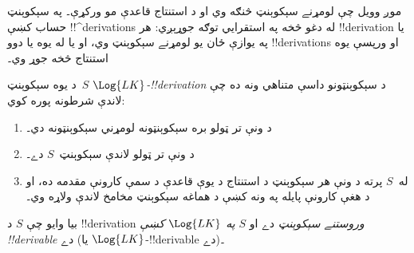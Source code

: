 \documentclass[../../../include/open-logic-section]{subfiles}
\begin{document}
      {}
      {}


\begin{explain}
موږ وويل چې لومړنے سېکوېنټ څنګه وي او د استنتاج قاعدې مو ورکړې۔
په سېکوېنټ حساب کښې !!^{derivation}s له دغو څخه په استقرايي توګه
جوړېږي: هر !!{derivation} يا په يوازې ځان يو لومړنے سېکوېنټ وي،
او يا له يوه يا دوو !!{derivation}s او ورپسې يوه استنتاج څخه جوړ وي۔
\end{explain}

\begin{defn}
د يوه سېکوېنټ~$S$ \emph{$\Log{LK}$-!!{derivation}} د سېکوېنټونو
داسې متناهي ونه ده چې لاندې شرطونه پوره کوي:
\begin{enumerate}
\item د ونې تر ټولو بره سېکوېنټونه لومړني سېکوېنټونه دي۔
\item د ونې تر ټولو لاندې سېکوېنټ~$S$ دے۔
\item له~$S$ پرته د ونې هر سېکوېنټ د استنتاج د يوې قاعدې د سمې
  کارونې مقدمه ده، او د هغې کارونې پايله په ونه کښې د هماغه
  سېکوېنټ مخامخ لاندې ولاړه وي۔
\end{enumerate}
بيا وايو چې $S$ د !!{derivation} \emph{وروستنے سېکوېنټ} دے او
$S$ \emph{په $\Log{LK}$ کښې !!{derivable}} دے (يا
$\Log{LK}$-!!{derivable} دے)۔
\end{defn}
\end{document}
